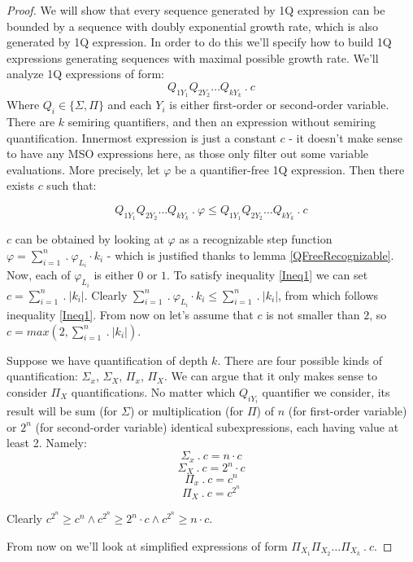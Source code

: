 \documentclass[12pt]{article}
\theoremstyle{definition}
\begin{document}
\begin{proof}
    We will show that every sequence generated by 1Q expression can be bounded by a sequence with doubly exponential growth rate, which is also generated by 1Q expression. In order to do this we'll specify how to build 1Q expressions generating sequences with maximal possible growth rate. We'll analyze 1Q expressions of form:
    $$Q_{1Y_1}Q_{2Y_2} \ldots Q_{kY_k} \ . \ c$$
    Where $Q_i \in \{ \Sigma, \Pi \}$ and each $Y_i$ is either first-order or second-order variable. There are $k$ semiring quantifiers, and then an expression without semiring quantification. Innermost expression is just a constant $c$ - it doesn't make sense to have any MSO expressions here, as those only filter out some variable evaluations. More precisely, let $\varphi$ be a quantifier-free 1Q expression. Then there exists $c$ such that:

    \begin{equation}
    \label{Ineq1}
        Q_{1Y_1}Q_{2Y_2} \ldots Q_{kY_k} \ . \ \varphi \leq Q_{1Y_1}Q_{2Y_2} \ldots Q_{kY_k} \ . \ c   
    \end{equation}

    $c$ can be obtained by looking at $\varphi$ as a recognizable step function $\varphi = \sum_{i = 1}^{n} \ . \ \varphi_{L_i} \cdot k_i$ - which is justified thanks to lemma \ref{QFreeRecognizable}. Now, each of $\varphi_{L_i}$ is either $0$ or $1$. To satisfy inequality \ref{Ineq1} we can set $c = \sum_{i=1}^n \ . \ |k_i|$. Clearly $\sum_{i = 1}^{n} \ . \ \varphi_{L_i} \cdot k_i \leq  \sum_{i=1}^n \ . \ |k_i|$, from which follows inequality \ref{Ineq1}. From now on let's assume that $c$ is not smaller than $2$, so $c = max(2, \sum_{i=1}^n \ . \ |k_i|)$.

    Suppose we have quantification of depth $k$. There are four possible kinds of quantification: $\Sigma_x$, $\Sigma_X$, $\Pi_x$, $\Pi_X$. We can argue that it only makes sense to consider $\Pi_X$ quantifications. No matter which $Q_{iY_i}$ quantifier we consider, its result will be sum (for $\Sigma$) or multiplication (for $\Pi$) of $n$ (for first-order variable) or $2^n$ (for second-order variable) identical subexpressions, each having value at least 2. Namely:
    $$\Sigma_x \ . \ c = n \cdot c$$
    $$\Sigma_X \ . \ c = 2^n \cdot c$$
    $$\Pi_x \ . \ c = c^n$$
    $$\Pi_X \ . \ c = c^{2^n}$$

    Clearly $c^{2^n} \geq c^n \land c^{2^n} \geq 2^n \cdot c \land c^{2^n} \geq n \cdot c$.

    From now on we'll look at simplified expressions of form $\Pi_{X_1}\Pi_{X_2}\ldots \Pi_{X_k} \ . \ c$.


\end{proof}
\end{document}
